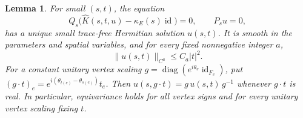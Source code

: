 \documentclass[11pt]{amsart}
\newtheorem{lemma}[theorem]{Lemma}
\theoremstyle{definition}
\theoremstyle{remark}
\newcommand{\diag}{\operatorname{diag}}
\newcommand{\id}{\operatorname{id}}
\begin{document}
\begin{lemma}\label{lem03:complement}
For small \((s,t)\), the equation
\begin{equation}\label{eq03:complement}
 Q_s\bigl(\widehat K(s,t,u)-\kappa_E(s)\id\bigr)=0,\qquad P_su=0,
\end{equation}
has a unique small trace-free Hermitian solution \(u(s,t)\).
It is smooth in the parameters and spatial variables, and for
every fixed nonnegative integer \(a\),
\begin{equation}\label{eq03:quadratic}
 \|u(s,t)\|_{C^a}\leq C_a|t|^2.
\end{equation}
For a constant unitary vertex scaling
\(g=\diag(e^{i\theta_v}\id_{F_v})\), put
\((g\cdot t)_e=e^{i(\theta_{t(e)}-\theta_{s(e)})}t_e\).
Then \(u(s,g\cdot t)=g\,u(s,t)\,g^{-1}\) whenever
\(g\cdot t\) is real. In particular, equivariance holds for all
vertex signs and for every unitary vertex scaling fixing \(t\).
\end{lemma}
\end{document}
